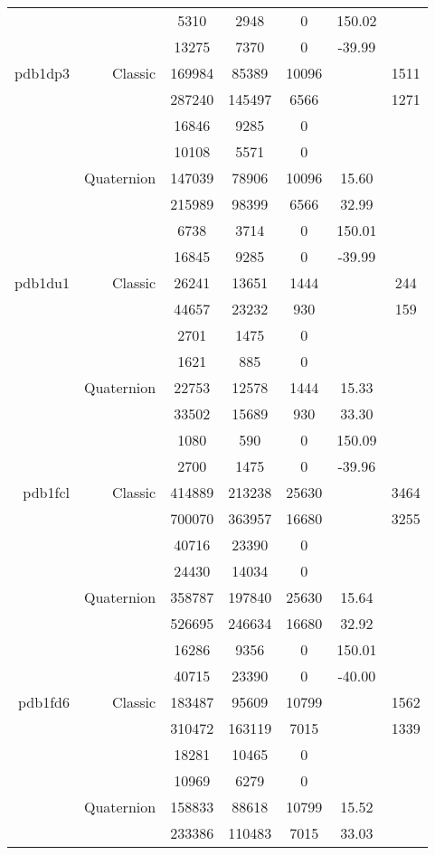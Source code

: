 \begin{xltabular}{\textwidth}{r|rcccSc}
& & 5310 & 2948 & 0 & 150.02 & \\
& & 13275 & 7370 & 0 & -39.99 & \\ \addlinespace
pdb1dp3 & Classic & 169984 & 85389 & 10096 & & 1511 \\
& & 287240 & 145497 & 6566 & & 1271 \\
& & 16846 & 9285 & 0 & & \\
& & 10108 & 5571 & 0 & & \\
& Quaternion & 147039 & 78906 & 10096 & 15.60 & \\
& & 215989 & 98399 & 6566 & 32.99 & \\
& & 6738 & 3714 & 0 & 150.01 & \\
& & 16845 & 9285 & 0 & -39.99 & \\ \addlinespace
pdb1du1 & Classic & 26241 & 13651 & 1444 & & 244 \\
& & 44657 & 23232 & 930 & & 159 \\
& & 2701 & 1475 & 0 & & \\
& & 1621 & 885 & 0 & & \\
& Quaternion & 22753 & 12578 & 1444 & 15.33 & \\
& & 33502 & 15689 & 930 & 33.30 & \\
& & 1080 & 590 & 0 & 150.09 & \\
& & 2700 & 1475 & 0 & -39.96 & \\ \addlinespace
pdb1fcl & Classic & 414889 & 213238 & 25630 & & 3464 \\
& & 700070 & 363957 & 16680 & & 3255 \\
& & 40716 & 23390 & 0 & & \\
& & 24430 & 14034 & 0 & & \\
& Quaternion & 358787 & 197840 & 25630 & 15.64 & \\
& & 526695 & 246634 & 16680 & 32.92 & \\
& & 16286 & 9356 & 0 & 150.01 & \\
& & 40715 & 23390 & 0 & -40.00 & \\ \addlinespace
pdb1fd6 & Classic & 183487 & 95609 & 10799 & & 1562 \\
& & 310472 & 163119 & 7015 & & 1339 \\
& & 18281 & 10465 & 0 & & \\
& & 10969 & 6279 & 0 & & \\
& Quaternion & 158833 & 88618 & 10799 & 15.52 & \\
& & 233386 & 110483 & 7015 & 33.03 & \\

\end{xltabular}
